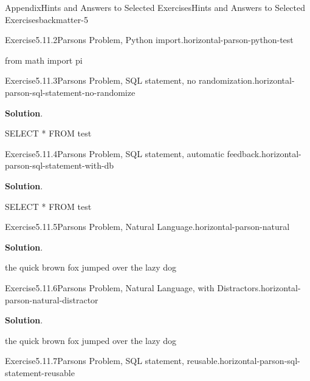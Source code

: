 \documentclass[oneside,10pt,]{book}
\newcommand{\blocktitlefont}{\relax}
\numberwithin{equation}{section}
\begin{document}
\begin{solutions-chapter}{Appendix}{Hints and Answers to Selected Exercises}{}{Hints and Answers to Selected Exercises}{}{}{backmatter-5}
\begin{divisionsolution}{Exercise}{5.11.2}{Parsons Problem, Python import.}{horizontal-parson-python-test}
\begin{codedisplay}
from math import pi
\end{codedisplay}
%
\end{divisionsolution}%
\begin{divisionsolution}{Exercise}{5.11.3}{Parsons Problem, SQL statement, no randomization.}{horizontal-parson-sql-statement-no-randomize}%
\par\smallskip%
\noindent\textbf{\blocktitlefont Solution}.\hypertarget{horizontal-parson-sql-statement-no-randomize-3-back}{}\quad{}%
\begin{codedisplay}
SELECT * FROM test
\end{codedisplay}
%
\end{divisionsolution}%
\begin{divisionsolution}{Exercise}{5.11.4}{Parsons Problem, SQL statement, automatic feedback.}{horizontal-parson-sql-statement-with-db}%
\par\smallskip%
\noindent\textbf{\blocktitlefont Solution}.\hypertarget{horizontal-parson-sql-statement-with-db-3-back}{}\quad{}%
\begin{codedisplay}
SELECT * FROM test
\end{codedisplay}
%
\end{divisionsolution}%
\begin{divisionsolution}{Exercise}{5.11.5}{Parsons Problem, Natural Language.}{horizontal-parson-natural}%
\par\smallskip%
\noindent\textbf{\blocktitlefont Solution}.\hypertarget{horizontal-parson-natural-3-back}{}\quad{}%
\begin{codedisplay}
the quick brown fox jumped over the lazy dog
\end{codedisplay}
%
\end{divisionsolution}%
\begin{divisionsolution}{Exercise}{5.11.6}{Parsons Problem, Natural Language, with Distractors.}{horizontal-parson-natural-distractor}%
\par\smallskip%
\noindent\textbf{\blocktitlefont Solution}.\hypertarget{horizontal-parson-natural-distractor-3-back}{}\quad{}%
\begin{codedisplay}
the quick brown fox jumped over the lazy dog
\end{codedisplay}
%
\end{divisionsolution}%
\begin{divisionsolution}{Exercise}{5.11.7}{Parsons Problem, SQL statement, reusable.}{horizontal-parson-sql-statement-reusable}%
\par\smallskip%

\end{divisionsolution}
\end{solutions-chapter}
\end{document}

